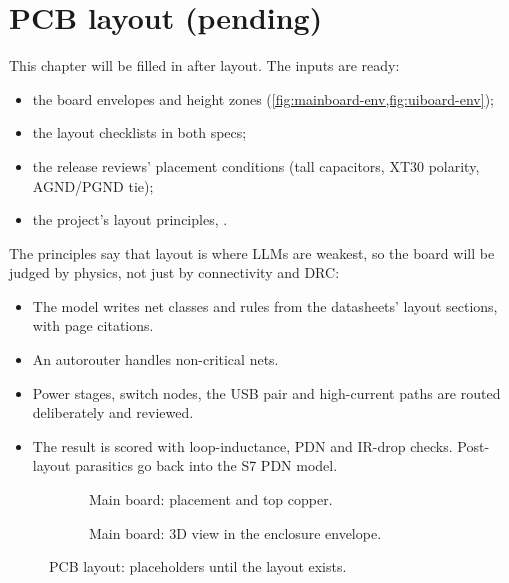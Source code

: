 \section{PCB layout (pending)}\label{sec:layout}

This chapter will be filled in after layout. The inputs are ready:
\begin{itemize}
  \item the board envelopes and height zones (\cref{fig:mainboard-env,fig:uiboard-env});
  \item the layout checklists in both specs;
  \item the release reviews' placement conditions (tall capacitors, XT30 polarity, AGND/PGND tie);
  \item the project's layout principles, .
\end{itemize}
The principles say that layout is where LLMs are weakest, so the board will be judged by physics, not just by connectivity and DRC:
\begin{itemize}
  \item The model writes net classes and rules from the datasheets' layout sections, with page citations.
  \item An autorouter handles non-critical nets.
  \item Power stages, switch nodes, the USB pair and high-current paths are routed deliberately and reviewed.
  \item The result is scored with loop-inductance, PDN and IR-drop checks. Post-layout parasitics go back into the S7 PDN model.
\end{itemize}

\begin{figure}[htbp]
\centering
\begin{subfigure}[t]{0.49\linewidth}\centering\pendingbox[0.95\linewidth]{4.5cm}\caption{Main board: placement and top copper.}\end{subfigure}\hfill
\begin{subfigure}[t]{0.49\linewidth}\centering\pendingbox[0.95\linewidth]{4.5cm}\caption{Main board: 3D view in the enclosure envelope.}\end{subfigure}
\caption{PCB layout: placeholders until the layout exists.}
\label{fig:layout-pending}
\end{figure}

